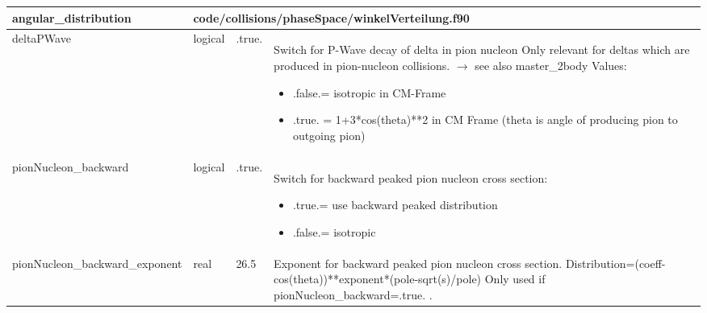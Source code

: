 \documentclass{article}
\begin{document}
\begin{longtable}{llll}
\toprule
\textbf{\large{angular\_distribution}} & \multicolumn{3}{l}{\footnotesize{code/collisions/phaseSpace/winkelVerteilung.f90}}\\*
\midrule
\endfirsthead
\midrule
\endhead
deltaPWave & \begin{minipage}[t]{2cm}logical\end{minipage} & \begin{minipage}[t]{2cm}.true.\end{minipage} & \begin{minipage}[t]{12cm}Switch for P-Wave decay of delta in pion nucleon Only relevant for deltas which are produced in pion-nucleon collisions. $\rightarrow$ see also master\_2body Values:\begin{itemize}\leftmargin0em\itemindent0pt\item .false.= isotropic in CM-Frame\item .true. = 1+3*cos(theta)**2 in CM Frame (theta is angle of producing   pion to outgoing pion)\end{itemize}\end{minipage}\\*
\midrule
pionNucleon\_backward & \begin{minipage}[t]{2cm}logical\end{minipage} & \begin{minipage}[t]{2cm}.true.\end{minipage} & \begin{minipage}[t]{12cm}Switch for backward peaked pion nucleon cross section:\begin{itemize}\leftmargin0em\itemindent0pt\item .true.= use backward peaked distribution\item .false.= isotropic\end{itemize}\end{minipage}\\*
\midrule
pionNucleon\_backward\_exponent & \begin{minipage}[t]{2cm}real\end{minipage} & \begin{minipage}[t]{2cm}26.5\end{minipage} & \begin{minipage}[t]{12cm}Exponent for backward peaked pion nucleon cross section. Distribution=(coeff-cos(theta))**exponent*(pole-sqrt(s)/pole) Only used if pionNucleon\_backward=.true. .\end{minipage}\\*

\end{longtable}
\end{document}
